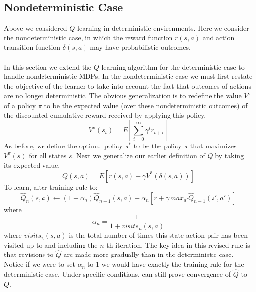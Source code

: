 \subsection{Nondeterministic Case}
Above we considered $Q$ learning in deterministic environments. Here we consider the nondeterministic case, in which the reward function $r(s, a)$ and action transition function $\delta(s, a)$ may have probabilistic outcomes.\\\\
In this section we extend the $Q$ learning  algorithm for the deterministic case to handle nondeterministic MDPs. In the nondeterministic case we must first restate the objective of the learner to take into account the fact that outcomes of actions are no longer deterministic. The obvious generalization is to redefine the value $V^\pi$ of a policy $\pi$ to be the expected value (over these nondeterministic outcomes) of the discounted cumulative reward  received by applying this policy.
\[V^\pi(s_t) = E\left[\sum_{i=0}^\infty \gamma^i r_{t+i} \right]\]
As before, we define the optimal policy $\pi^*$ to be the policy $\pi$ that maximizes $V^\pi(s)$ for all states $s$. Next  we generalize our earlier definition of $Q$ by taking its expected value.
\[Q(s,a) = E[r(s,a) + \gamma V^*(\delta(s,a))]\]
To learn, alter training rule to:
\begin{equation}
    \hat{Q}_n(s,a) \leftarrow (1 - \alpha_n)\hat{Q}_{n-1}(s,a) + \alpha_n [r + \gamma \, max_{a'}\hat{Q}_{n-1}(s', a')]
\end{equation}
where
\[\alpha_n = \frac{1}{1 + visits_n(s,a)}\]
where $visits_n(s,a)$  is the  total number of times this state-action pair  has been visited up to and including the $n$-th iteration. The key idea in this revised rule is that revisions to $\hat{Q}$ are made more gradually than in  the deterministic case. Notice if we were to set $\alpha_n$ to 1 we would have exactly the training rule for the deterministic case. Under specific conditions, can still prove convergence of $\hat{Q}$ to $Q$.

